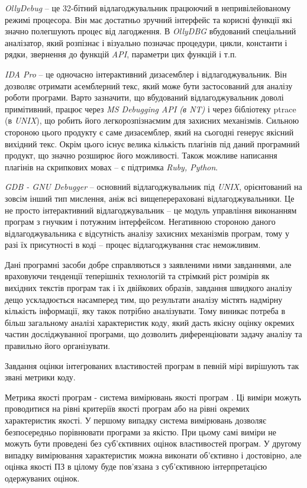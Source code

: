 {\it OllyDebug} – це 32-бітний відлагоджувальник працюючий в непривілейованому режимі процесора. Він має достатньо зручний інтерфейс та корисні функції які значно полегшують процес від лагодження.  В {\it OllyDBG} вбудований спеціальний аналізатор, який розпізнає і візуально позначає процедури, цикли, константи і рядки, звернення до функцій {\it API}, параметри цих функцій і т.п.

{\it IDA Pro} – це одночасно інтерактивний дизасемблер і відлагоджувальник. Він дозволяє отримати асемблерний текс, який може бути застосований для аналізу роботи програми. Варто зазначити, що вбудований відлагоджувальник доволі примітивний, працює через {\it MS Debugging API (в NT)} і через бібліотеку ptrace (в {\it UNIX}), що робить його легкорозпізнаємим для захисних механізмів. Сильною стороною цього продукту є саме дизасемблер, який на сьогодні генерує якісний вихідний текс. Окрім цього існує велика кількість плагінів під даний програмний продукт, що значно розширює його можливості. Також можливе написання плагінів на скрипкових мовах – є підтримка {\it Ruby, Python}.

{\it GDB - GNU Debugger} – основний відлагоджувальник під {\it UNIX}, орієнтований на зовсім інший тип мислення, аніж всі вищеперераховані відлагоджувальники. Це не просто інтерактивний відлагоджувальник – це модуль управління виконанням програм з гнучким і потужним інтерфейсом. Негативною стороною даного відлагоджувальника є відсутність аналізу захисних механізмів програм, тому у разі їх присутності в коді – процес відлагоджування стає неможливим.

Дані програмні засоби добре справляються з заявленими ними завданнями, але враховуючи тенденції теперішніх технологій та стрімкий ріст розмірів як вихідних текстів програм так і їх двійкових образів, завдання швидкого аналізу дещо ускладюється насамперед тим, що результати аналізу містять надмірну кількість інформації, яку такок потрібно аналізувати. Тому виникає потреба в більш загальному аналізі характеристик коду, який дасть якісну оцінку окремих частин досліджуванної програми, що дозволить диференціювати задачу аналізу та правильно його організувати.

Завдання оцінки інтегрованих властивостей програм в певній мірі вирішують так звані метрики коду. 

Метрика якості програм - система вимірювань якості програм . Ці виміри можуть проводитися на рівні критеріїв якості програм або на рівні окремих характеристик якості. У першому випадку система вимірювань дозволяє безпосередньо порівнювати програми за якістю. При цьому самі виміри не можуть бути проведені без суб'єктивних оцінок властивостей програм. У другому випадку вимірювання характеристик можна виконати об'єктивно і достовірно, але оцінка якості ПЗ в цілому буде пов'язана з суб'єктивною інтерпретацією одержуваних оцінок.

